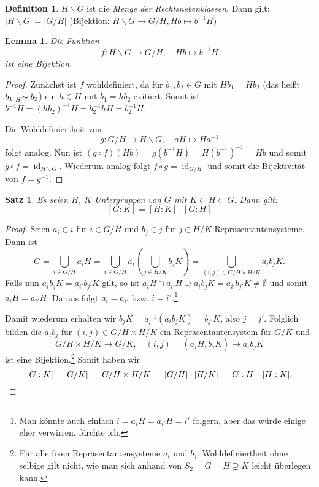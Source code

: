 \documentclass[12pt]{scrartcl} %
\DeclareMathOperator{\id}{id}
\newtheorem{thm}{Satz}
\newtheorem{lemma}{Lemma}
\theoremstyle{definition}
\newtheorem*{defn}{Definition}
\theoremstyle{remark}
\begin{document}
\begin{defn}
	$H \backslash G$ ist die \emph{Menge der Rechtsnebenklassen}. Dann gilt: $\vert H \backslash G \vert = \vert G/H \vert$
	(Bijektion: $H \backslash G \rightarrow G/H, Hb \mapsto b^{-1}H$)
\end{defn}

\begin{lemma} 
	Die Funktion $$f: H\backslash G \to G/H, \quad Hb \mapsto b^{-1}H$$ ist eine Bijektion.
\end{lemma}

\begin{proof}
	Zunächst ist \(f\) wohldefiniert, da für $b_{1},b_{2} \in G$ mit $Hb_{1}=Hb_{2}$ (das heißt \(b_1 \mathrel{\prescript{}{H}{\sim}} b_2\)) ein $h \in H$ mit $b_1 = hb_2$ exitiert.
	Somit ist $b^{-1}H = (hb_2)^{-1}H = b_{2}^{-1}hH = b_{2}^{-1}H$.

	Die Wohldefiniertheit von $$g: G/H \to H\backslash G, \quad aH \mapsto Ha^{-1}$$ folgt analog.
	Nun ist $(g \circ f)(Hb) = g(b^{-1}H)=H(b^{-1})^{-1}=Hb$ und somit $g \circ f = \id_{H \backslash G}$.
	Wiederum analog folgt $f \circ g = \id_{G \slash H}$ und somit die Bijektivität von \(f = g^{-1}\).
\end{proof}

\begin{thm}
	Es seien $H$, $K$ Untergruppen von $G$ mit $K \subset H \subset G$.
	Dann gilt: $$[G:K]=[H:K]\cdot[G:H]$$
\end{thm}

\begin{proof}
	Seien \(a_i \in i\) für \(i \in G/H\) und \(b_j \in j\) für \(j \in H/K\) Repräsentantensysteme.
	Dann ist \[G = \bigcup_{i \in G/H} a_iH = \bigcup_{i \in G/H} a_i\left(\bigcup_{j\in H/K} b_jK\right) = \bigcup_{(i, j) \in G/H\times H/K} a_ib_jK.\]
	Falls nun \(a_ib_jK = a_{i'}b_{j'}K\) gilt, so ist \(a_iH \cap a_{i'}H \supseteq a_ib_jK = a_{i'}b_{j'}K \neq \emptyset\) und somit \(a_iH = a_{i'}H\).
	Daraus folgt \(a_i = a_{i'}\) bzw. \(i = i'\).\footnote{Man könnte auch einfach \(i = a_iH = a_{i'}H = i'\) folgern, aber das würde einige eher verwirren, fürchte ich.}

	Damit wiederum erhalten wir \(b_jK = a_i^{-1}(a_ib_jK) = b_{j'}K\), also \(j = j'\).
	Folglich bilden die \(a_ib_j\) für \((i, j) \in G/H\times H/K\) ein Repräsentantensystem für \(G/K\) und \[G/H\times H/K \to G/K, \quad (i, j) = (a_iH, b_jK) \mapsto a_ib_jK\] ist eine Bijektion.\footnote{Für alle fixen Repräsentantensysteme \(a_i\) und \(b_j\). Wohldefiniertheit ohne selbige gilt nicht, wie man sich anhand von \(S_2 = G = H \supsetneq K\) leicht überlegen kann.}
	Somit haben wir \[[G:K] = |G/K| = |G/H \times H/K| = |G/H|\cdot|H/K| = [G:H]\cdot[H:K].\qedhere\]
\end{proof}
\end{document}
